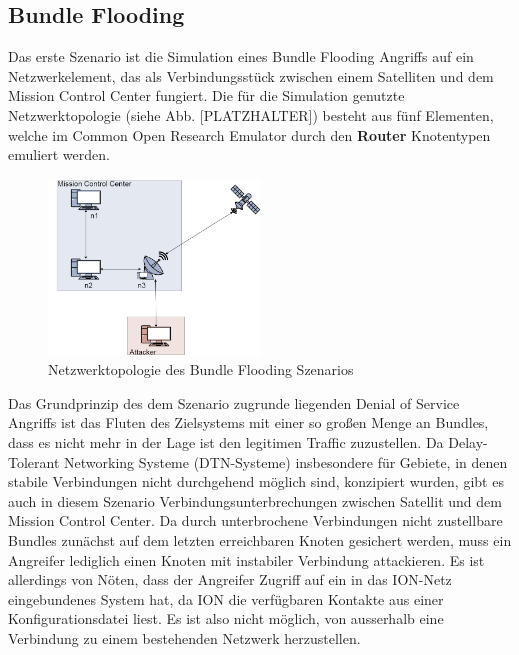 \documentclass{article}
\begin{document}
\subsection{Bundle Flooding}
Das erste Szenario ist die Simulation eines Bundle Flooding Angriffs auf ein Netzwerkelement, das als Verbindungsstück zwischen einem Satelliten und dem Mission Control Center fungiert. Die für die Simulation genutzte Netzwerktopologie (siehe Abb. [PLATZHALTER]) besteht aus fünf Elementen, welche im Common Open Research Emulator durch den \textbf{Router} Knotentypen emuliert werden.\par
\begin{figure}[h]
\centering
\includegraphics[width=0.5\textwidth]{flooding}
\caption{Netzwerktopologie des Bundle Flooding Szenarios}
\end{figure}
Das Grundprinzip des dem Szenario zugrunde liegenden Denial of Service Angriffs ist das Fluten des Zielsystems mit einer so großen Menge an Bundles, dass es nicht mehr in der Lage ist den legitimen Traffic zuzustellen. Da Delay-Tolerant Networking Systeme (DTN-Systeme) insbesondere für Gebiete, in denen stabile Verbindungen nicht durchgehend möglich sind, konzipiert wurden, gibt es auch in diesem Szenario Verbindungsunterbrechungen zwischen Satellit und dem Mission Control Center. Da durch unterbrochene Verbindungen nicht zustellbare Bundles zunächst auf dem letzten erreichbaren Knoten gesichert werden, muss ein Angreifer lediglich einen Knoten mit instabiler Verbindung attackieren. Es ist allerdings von Nöten, dass der Angreifer Zugriff auf ein in das ION-Netz eingebundenes System hat, da ION die verfügbaren Kontakte aus einer Konfigurationsdatei liest. Es ist also nicht möglich, von ausserhalb eine Verbindung zu einem bestehenden Netzwerk herzustellen.\par
\end{document}
